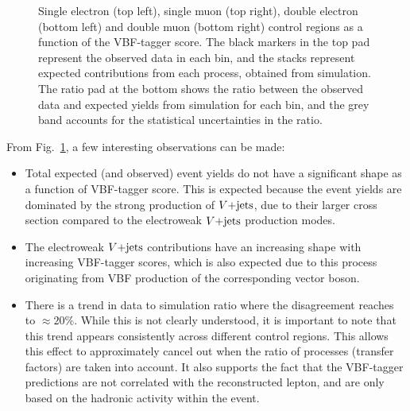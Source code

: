 \begin{figure}[htbp]
    \caption{Single electron (top left), single muon (top right), double electron (bottom left) and double muon (bottom right) control regions 
    as a function of the VBF-tagger score. The black markers in the top pad
    represent the observed data in each bin, and the stacks represent expected contributions from each process, obtained from simulation. The ratio pad
    at the bottom shows the ratio between the observed data and expected yields from simulation for each bin, and the grey band accounts for the statistical 
    uncertainties in the ratio.}
    \label{fig:single_lep_crs_vbfml}
\end{figure}

From Fig.~\ref{fig:single_lep_crs_vbfml}, a few interesting observations can be made:

\begin{itemize}
    \item Total expected (and observed) event yields do not have a significant shape as a function of VBF-tagger score. 
    This is expected because the event yields are dominated by the strong production of $V\text{+jets}$, due to their larger cross section
    compared to the electroweak $V\text{+jets}$ production modes.
    \item The electroweak $V\text{+jets}$ contributions have an increasing shape with increasing VBF-tagger
    scores, which is also expected due to this process originating from VBF production of the corresponding vector boson.
    \item There is a trend in data to simulation ratio where the disagreement reaches to $\approx 20\%$. While this is not clearly
    understood, it is important to note that this trend appears consistently across different control regions. This allows this effect
    to approximately cancel out when the ratio of processes (transfer factors) are taken into account. It also supports the fact that
    the VBF-tagger predictions are not correlated with the reconstructed lepton, and are only based on the hadronic activity within the event.  
\end{itemize}

